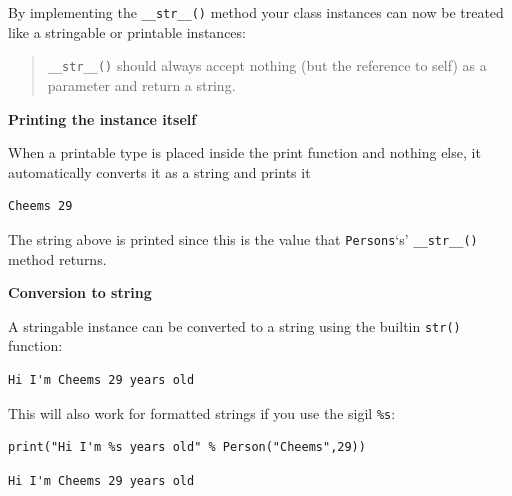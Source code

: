 By implementing the \texttt{\_\_str\_\_()} method your class instances
can now be treated like a stringable or printable instances:

\begin{quote}
\texttt{\_\_str\_\_()} should always accept nothing (but the reference
to self) as a parameter and return a string.
\end{quote}

\textbf{Printing the instance itself}

When a printable type is placed inside the print function and nothing
else, it automatically converts it as a string and prints it

\begin{Shaded}
\begin{Highlighting}[]
\NormalTok{,}\NormalTok{))}
\end{Highlighting}
\end{Shaded}

\begin{verbatim}
Cheems 29
\end{verbatim}

The string above is printed since this is the value that
\texttt{Persons}`s' \texttt{\_\_str\_\_()} method returns.

\textbf{Conversion to string}

A stringable instance can be converted to a string using the builtin
\texttt{str()} function:

\begin{Shaded}
\begin{Highlighting}[]
\NormalTok{(} \OperatorTok{+} \NormalTok{,}\NormalTok{)) }\OperatorTok{+} \NormalTok{)}
\end{Highlighting}
\end{Shaded}

\begin{verbatim}
Hi I'm Cheems 29 years old
\end{verbatim}

This will also work for formatted strings if you use the sigil
\texttt{\%s}:

\begin{verbatim}
print("Hi I'm %s years old" % Person("Cheems",29))
\end{verbatim}

\begin{verbatim}
Hi I'm Cheems 29 years old
\end{verbatim}

